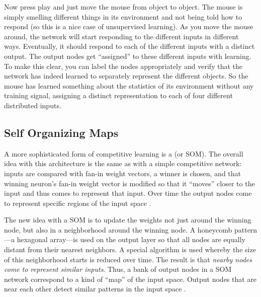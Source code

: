 Now press play and just move the mouse from object to object. The mouse is simply smelling different things in its environment and not being told how to respond (so this is a nice case of unsupervised learning). As you move the mouse around, the network will start responding to the different inputs in different ways. Eventually, it should respond to each of the different inputs with a distinct output. The output nodes get ``assigned'' to these different inputs with learning. To make this clear, you can label the nodes appropriately and verify that the network has indeed learned to separately represent the different objects. So the mouse has learned something about the statistics of its environment without any training signal, assigning a distinct representation to each of four different distributed inputs.

\subsection{Self Organizing Maps}

A more sophisticated form of competitive learning is a  (or SOM). The overall idea with this architecture is the same as with a simple competitive network: inputs are compared with fan-in weight vectors, a winner is chosen, and that winning neuron's fan-in weight vector is modified so that it ``moves'' closer to the input and thus comes to represent that input. Over time the output nodes come to represent specific regions of the input space \cite{kohonen1990self}.

The new idea with a SOM is to update the weights not just around the winning node, but also in a neighborhood around the winning node. A honeycomb pattern---a hexagonal array---is used on the output layer so that all nodes are equally distant from their nearest neighbors. A special algorithm is used whereby the size of this neighborhood starts is reduced over time. The result is that \emph{nearby nodes come to represent similar inputs}. Thus, a bank of output nodes in a SOM network correspond to a kind of ``map'' of the input space. Output nodes that are near each other detect similar patterns in the input space \cite{kohonen1990self}. 



